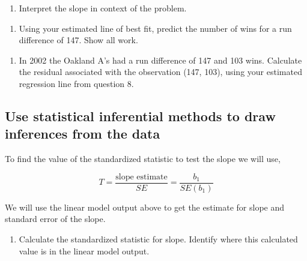 \documentclass[
]{report}
\providecommand{\tightlist}{%
  \setlength{\itemsep}{0pt}\setlength{\parskip}{0pt}}
\begin{document}
\begin{enumerate}
\def\labelenumi{\arabic{enumi}.}
\setcounter{enumi}{8}
\tightlist
\item
  Interpret the slope in context of the problem.
\end{enumerate}

\vspace{1in}

\begin{enumerate}
\def\labelenumi{\arabic{enumi}.}
\setcounter{enumi}{9}
\tightlist
\item
  Using your estimated line of best fit, predict the number of wins for a run difference of 147. Show all work.
\end{enumerate}

\vspace{1in}

\begin{enumerate}
\def\labelenumi{\arabic{enumi}.}
\setcounter{enumi}{10}
\tightlist
\item
  In 2002 the Oakland A's had a run difference of 147 and 103 wins. Calculate the residual associated with the observation (147, 103), using your estimated regression line from question 8.
\end{enumerate}

\vspace{1in}

\hypertarget{use-statistical-inferential-methods-to-draw-inferences-from-the-data}{%
\subsection*{Use statistical inferential methods to draw inferences from the data}\label{use-statistical-inferential-methods-to-draw-inferences-from-the-data}}

To find the value of the standardized statistic to test the slope we will use,

\[
T = \frac{\mbox{slope estimate}}{SE} = \frac{b_1}{SE(b_1)}
\]

We will use the linear model output above to get the estimate for slope and standard error of the slope.

\begin{enumerate}
\def\labelenumi{\arabic{enumi}.}
\setcounter{enumi}{11}
\tightlist
\item
  Calculate the standardized statistic for slope. Identify where this calculated value is in the linear model output.
\end{enumerate}
\end{document}

